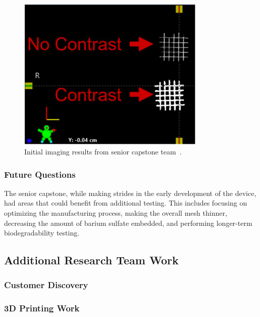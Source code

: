 \begin{figure}[h!]
        \centering
        \includegraphics[width=0.8\textwidth]{../figs/introduction/capstone_imaging_testing.png}
        \caption{Initial imaging results from senior capstone team~\cite{RefWorks:RefID:372-krakovskytumor}.}
        \label{fig:introduction:capstoneImagingTesting}
\end{figure}

\subsubsection{Future Questions\label{sec:introduction:priorWork:seniorCapstone:futureQuestions}}

The senior capstone, while making strides in the early development of the device, had areas that could benefit from additional testing. This includes focusing on optimizing the manufacturing process, making the overall mesh thinner, decreasing the amount of barium sulfate embedded, and performing longer-term biodegradability testing.

\subsection{Additional Research Team Work\label{sec:introduction:priorWork:otherTeamWork}}

\subsubsection{Customer Discovery\label{sec:introduction:priorWork:otherTeamWork:customerDiscovery}}

\subsubsection{3D Printing Work\label{sec:introduction:priorWork:otherTeamWork:3dPrinting}}

